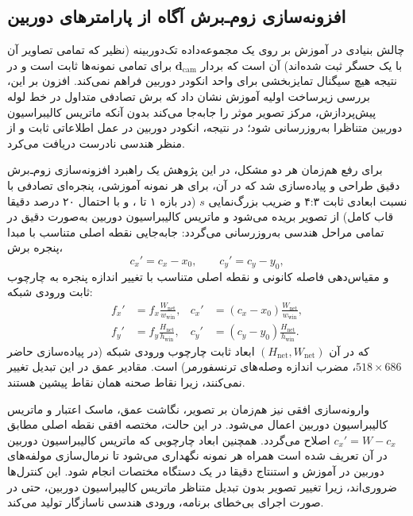 \subsection{افزونه‌سازی زوم‌ـ‌برش آگاه از پارامترهای دوربین}
\label{subsec:fov_augmentation}

چالش بنیادی در آموزش \proposedmodel{} بر روی یک مجموعه‌داده تک‌دوربینه (نظیر  که تمامی تصاویر آن با یک حسگر  ثبت شده‌اند) آن است که بردار $\mathbf{d}_{\mathrm{cam}}$ برای تمامی نمونه‌ها ثابت است و در نتیجه هیچ سیگنال تمایزبخشی برای واحد انکودر دوربین فراهم نمی‌کند. افزون بر این، بررسی زیرساخت اولیه آموزش نشان داد که برش تصادفی متداول در خط لوله پیش‌پردازش، مرکز تصویر موثر را جابه‌جا می‌کند بدون آنکه ماتریس کالیبراسیون دوربین متناظرا به‌روزرسانی شود؛ در نتیجه، انکودر دوربین در عمل اطلاعاتی ثابت و از منظر هندسی نادرست دریافت می‌کرد.

برای رفع هم‌زمان هر دو مشکل، در این پژوهش یک راهبرد افزونه‌سازی زوم‌ـ‌برش دقیق طراحی و پیاده‌سازی شد که در آن، برای هر نمونه آموزشی، پنجره‌ای تصادفی با نسبت ابعادی ثابت ۴:۳ و ضریب بزرگ‌نمایی $s$ (در بازه ۱ تا ، و با احتمال ۲۰ درصد دقیقا قاب کامل) از تصویر بریده می‌شود و ماتریس کالیبراسیون دوربین به‌صورت دقیق در تمامی مراحل هندسی به‌روزرسانی می‌گردد: جابه‌جایی نقطه اصلی متناسب با مبدا پنجره برش،
\begin{equation}
c_x' = c_x - x_0, \qquad c_y' = c_y - y_0,
\end{equation}
و مقیاس‌دهی فاصله کانونی و نقطه اصلی متناسب با تغییر اندازه پنجره به چارچوب ثابت ورودی شبکه:
\begin{equation}
\begin{aligned}
f_x' &= f_x \frac{W_{\mathrm{net}}}{w_{\mathrm{win}}}, &
c_x' &= (c_x-x_0)\frac{W_{\mathrm{net}}}{w_{\mathrm{win}}},\\
f_y' &= f_y \frac{H_{\mathrm{net}}}{h_{\mathrm{win}}}, &
c_y' &= (c_y-y_0)\frac{H_{\mathrm{net}}}{h_{\mathrm{win}}}.
\end{aligned}
\end{equation}
که در آن $(H_{\mathrm{net}}, W_{\mathrm{net}})$ ابعاد ثابت چارچوب ورودی شبکه (در پیاده‌سازی حاضر $518 \times 686$، مضرب اندازه وصله‌های ترنسفورمر) است. مقادیر عمق در این تبدیل تغییر نمی‌کنند، زیرا نقاط صحنه همان نقاط پیشین هستند.




وارونه‌سازی افقی نیز هم‌زمان بر تصویر، نگاشت عمق، ماسک اعتبار و ماتریس کالیبراسیون دوربین اعمال می‌شود. در این حالت، مختصه افقی نقطه اصلی مطابق $c_x'=W-c_x$ اصلاح می‌گردد. همچنین ابعاد چارچوبی که ماتریس کالیبراسیون دوربین در آن تعریف شده است همراه هر نمونه نگهداری می‌شود تا نرمال‌سازی مولفه‌های دوربین در آموزش و استنتاج دقیقا در یک دستگاه مختصات انجام شود. این کنترل‌ها ضروری‌اند، زیرا تغییر تصویر بدون تبدیل متناظر ماتریس کالیبراسیون دوربین، حتی در صورت اجرای بی‌خطای برنامه، ورودی هندسی ناسازگار تولید می‌کند.

